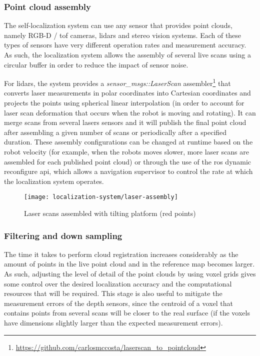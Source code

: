 \subsubsection{Point cloud assembly}

The self-localization system can use any sensor that provides point clouds, namely RGB-D / \gls{tof} cameras, \glspl{lidar} and stereo vision systems. Each of these types of sensors have very different operation rates and measurement accuracy. As such, the localization system allows the assembly of several live scans using a circular buffer in order to reduce the impact of sensor noise.

For \glspl{lidar}, the system provides a \emph{sensor\_msgs::LaserScan} assembler\footnote{\url{https://github.com/carlosmccosta/laserscan_to_pointcloud}} that converts laser measurements in polar coordinates into Cartesian coordinates and projects the points using spherical linear interpolation (in order to account for laser scan deformation that occurs when the robot is moving and rotating). It can merge scans from several lasers sensors and it will publish the final point cloud after assembling a given number of scans or periodically after a specified duration. These assembly configurations can be changed at runtime based on the robot velocity (for example, when the robots moves slower, more laser scans are assembled for each published point cloud) or through the use of the \gls{ros} dynamic reconfigure \gls{api}, which allows a navigation supervisor to control the rate at which the localization system operates.


\begin{figure}[H]
	\centering
	\texttt{[image: localization-system/laser-assembly]}
	\caption{Laser scans assembled with tilting platform (red points)}
	\label{fig:localization-system_section_laser_assembly}
\end{figure}


\subsubsection{Filtering and down sampling}

The time it takes to perform cloud registration increases considerably as the amount of points in the live point cloud and in the reference map becomes larger. As such, adjusting the level of detail of the point clouds by using voxel grids gives some control over the desired localization accuracy and the computational resources that will be required. This stage is also useful to mitigate the measurement errors of the depth sensors, since the centroid of a voxel that contains points from several scans will be closer to the real surface (if the voxels have dimensions slightly larger than the expected measurement errors).

